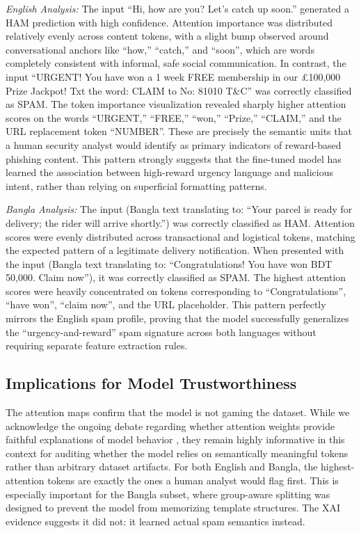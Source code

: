 \documentclass[journal]{IEEEtran}
\begin{document}
\textit{English Analysis:} The input ``Hi, how are you? Let's catch up soon.'' generated a HAM prediction with high confidence. Attention importance was distributed relatively evenly across content tokens, with a slight bump observed around conversational anchors like ``how,'' ``catch,'' and ``soon'', which are words completely consistent with informal, safe social communication. In contrast, the input ``URGENT! You have won a 1 week FREE membership in our \pounds 100,000 Prize Jackpot! Txt the word: CLAIM to No: 81010 T\&C'' was correctly classified as SPAM. The token importance visualization revealed sharply higher attention scores on the words ``URGENT,'' ``FREE,'' ``won,'' ``Prize,'' ``CLAIM,'' and the URL replacement token ``NUMBER''. These are precisely the semantic units that a human security analyst would identify as primary indicators of reward-based phishing content. This pattern strongly suggests that the fine-tuned model has learned the association between high-reward urgency language and malicious intent, rather than relying on superficial formatting patterns.

\textit{Bangla Analysis:} The input (Bangla text translating to: ``Your parcel is ready for delivery; the rider will arrive shortly.'') was correctly classified as HAM. Attention scores were evenly distributed across transactional and logistical tokens, matching the expected pattern of a legitimate delivery notification. When presented with the input (Bangla text translating to: ``Congratulations! You have won BDT 50,000. Claim now''), it was correctly classified as SPAM. The highest attention scores were heavily concentrated on tokens corresponding to ``Congratulations'', ``have won'', ``claim now'', and the URL placeholder. This pattern perfectly mirrors the English spam profile, proving that the model successfully generalizes the ``urgency-and-reward'' spam signature across both languages without requiring separate feature extraction rules.

\subsection{Implications for Model Trustworthiness}

The attention maps confirm that the model is not gaming the dataset. While we acknowledge the ongoing debate regarding whether attention weights provide faithful explanations of model behavior \cite{jain2019attention}, they remain highly informative in this context for auditing whether the model relies on semantically meaningful tokens rather than arbitrary dataset artifacts. For both English and Bangla, the highest-attention tokens are exactly the ones a human analyst would flag first. This is especially important for the Bangla subset, where group-aware splitting was designed to prevent the model from memorizing template structures. The XAI evidence suggests it did not: it learned actual spam semantics instead.
\end{document}
